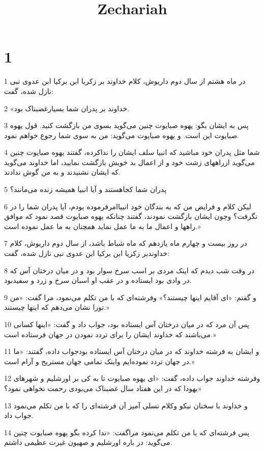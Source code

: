 

\title{Zechariah}


\chapter{1}

\par 1 در ماه هشتم از سال دوم داریوش، کلام خداوند بر زکریا ابن برکیا ابن عدوی نبی نازل شده، گفت:
\par 2 «خداوند بر پدران شما بسیارغضبناک بود.
\par 3 پس به ایشان بگو: یهوه صبایوت چنین می‌گوید بسوی من بازگشت کنید. قول یهوه صبایوت این است. و یهوه صبایوت می‌گوید: من به سوی شما رجوع خواهم نمود.
\par 4 شما مثل پدران خود مباشید که انبیا سلف ایشان را نداکرده، گفتند یهوه صبایوت چنین می‌گوید ازراههای زشت خود و از اعمال بد خویش بازگشت نمایید، اما خداوند می‌گوید که ایشان نشنیدند و به من گوش ندادند.
\par 5 پدران شما کجاهستند و آیا انبیا همیشه زنده می‌مانند؟
\par 6 لیکن کلام و فرایض من که به بندگان خود انبیاامرفرموده بودم، آیا پدران شما را در نگرفت؟ وچون ایشان بازگشت نمودند، گفتند چنانکه یهوه صبایوت قصد نمود که موافق راهها و اعمال ما به ما عمل نماید همچنان به ما عمل نموده است.»
\par 7 در روز بیست و چهارم ماه یازدهم که ماه شباط باشد، از سال دوم داریوش، کلام خداوندبر زکریا ابن برکیا ابن عدوی نبی نازل شده، گفت:
\par 8 در وقت شب دیدم که اینک مردی بر اسب سرخ سوار بود و در میان درختان آس که در وادی بود ایستاده و در عقب او اسبان سرخ و زرد و سفیدبود.
\par 9 و گفتم: «ای آقایم اینها چیستند؟» وفرشته‌ای که با من تکلم می‌نمود، مرا گفت: «من تورا نشان می‌دهم که اینها چیستند.»
\par 10 پس آن مرد که در میان درختان آس ایستاده بود، جواب داد و گفت: «اینها کسانی می‌باشند که خداوند ایشان را برای تردد نمودن در جهان فرستاده است.»
\par 11 و ایشان به فرشته خداوند که در میان درختان آس ایستاده بودجواب داده، گفتند: «ما در جهان تردد نموده‌ایم واینک تمامی جهان مستریح و آرام است.»
\par 12 وفرشته خداوند جواب داده، گفت: «ای یهوه صبایوت تا به کی بر اورشلیم و شهرهای یهودا که در این هفتاد سال غضبناک می‌بودی رحمت نخواهی نمود؟»
\par 13 و خداوند با سخنان نیکو وکلام تسلی آمیز آن فرشته‌ای را که با من تکلم می‌نمود جواب داد.
\par 14 پس فرشته‌ای که با من تکلم می‌نمود مراگفت: «ندا کرده بگو یهوه صبایوت چنین می‌گوید: در باره اورشلیم و صهیون غیرت عظیمی داشتم.
